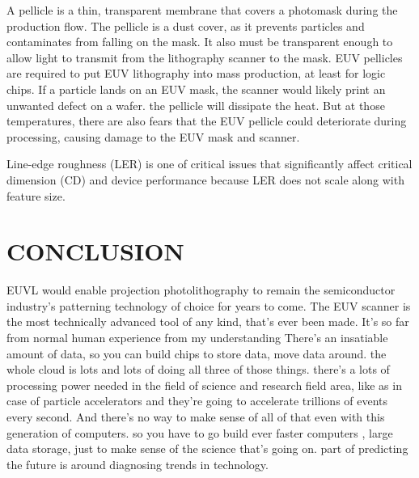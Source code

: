 \documentclass[12pt,a4paper]{report}
\begin{document}
A pellicle is a thin, transparent membrane that covers a 
photomask during the production flow. The pellicle is a dust 
cover, as it prevents particles and contaminates from falling 
on the mask. It also must be transparent enough to allow light 
to transmit from the lithography scanner to the mask.
EUV pellicles are required to put EUV lithography into mass 
production, at least for logic chips. If a particle lands on 
an EUV mask, the scanner would likely print an unwanted defect 
on a wafer.
the pellicle will dissipate the heat. But at those temperatures, 
there are also fears that the EUV pellicle could deteriorate 
during processing, causing damage to the EUV mask and scanner.



Line-edge
roughness (LER) is one of critical issues that significantly 
affect critical dimension (CD) and device
performance because LER does not scale along with feature size.

\chapter{CONCLUSION}
EUVL would enable projection photolithography to remain the 
semiconductor industry’s patterning technology of choice 
for years to come. The EUV scanner is the most technically 
advanced tool of any kind, that's ever been made. 
It's so far from
normal human experience from my understanding
There's an insatiable amount of data, so you can build chips to store data, move data around. the whole cloud is lots
and lots of doing all three of those things. 
there's a lots of processing power needed in the field of science and research field area, like as in case 
of  particle accelerators and they're going to accelerate 
trillions of events every second. And there's no way to make 
sense of all of that even with this generation of computers. so you have to go build ever faster computers
, large data storage, just to make sense of the science that's going on. part of predicting the future is around
diagnosing trends in technology.
\end{document}
